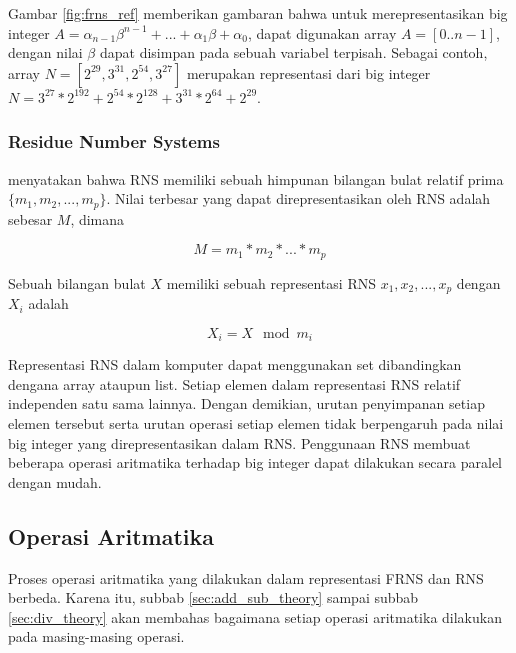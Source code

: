       Gambar \ref{fig:frns_ref} memberikan gambaran bahwa untuk merepresentasikan big integer $A = \alpha_{n-1}\beta^{n-1}+...+\alpha_{1}\beta+\alpha_{0}$, dapat digunakan array $A = [0..n-1]$, dengan nilai $\beta$ dapat disimpan pada sebuah variabel terpisah. Sebagai contoh, array $N = [2^29, 3^31, 2^54, 3^27]$ merupakan representasi dari big integer $N = 3^27*2^192 + 2^54*2^128 + 3^31*2^64 + 2^29$.

    \subsubsection{Residue Number Systems} \label{sec:rns}
      \citet{rns_survey} menyatakan bahwa RNS memiliki sebuah himpunan bilangan bulat relatif prima $\{m_1,m_2,...,m_p\}$. Nilai terbesar yang dapat direpresentasikan oleh RNS adalah sebesar $M$, dimana

      \begin{equation}
        M = m_1 * m_2 * ... * m_p
      \end{equation}

      Sebuah bilangan bulat $X$ memiliki sebuah representasi RNS ${x_1,x_2,...,x_p}$ dengan $X_i$ adalah

      \begin{equation}
        X_i = X \mod m_i
      \end{equation}


      Representasi RNS dalam komputer dapat menggunakan set dibandingkan dengana array ataupun list. Setiap elemen dalam representasi RNS relatif independen satu sama lainnya. Dengan demikian, urutan penyimpanan setiap elemen tersebut serta urutan operasi setiap elemen tidak berpengaruh pada nilai big integer yang direpresentasikan dalam RNS. Penggunaan RNS membuat beberapa operasi aritmatika terhadap big integer dapat dilakukan secara paralel dengan mudah.


  \subsection{Operasi Aritmatika}

    Proses operasi aritmatika yang dilakukan dalam representasi FRNS dan RNS berbeda. Karena itu, subbab \ref{sec:add_sub_theory} sampai subbab \ref{sec:div_theory} akan membahas bagaimana setiap operasi aritmatika dilakukan pada masing-masing operasi.


